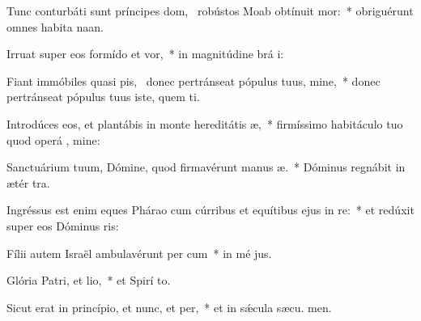 \item Tunc conturbáti sunt príncipes dom,~\pscross{} robústos Moab obtínuit mor:~* obriguérunt omnes habita naan.
\item Irruat super eos formído et vor,~* in magnitúdine brá i:
\item Fiant immóbiles quasi pis,~\pscross{} donec pertránseat pópulus tuus, mine,~* donec pertránseat pópulus tuus iste, quem ti.
\item Introdúces eos, et plantábis in monte hereditátis æ,~* firmíssimo habitáculo tuo quod operá , mine:
\item Sanctuárium tuum, Dómine, quod firmavérunt manus æ.~* Dóminus regnábit in ætér  tra.
\item Ingréssus est enim eques Phárao cum cúrribus et equítibus ejus in re:~* et redúxit super eos Dóminus  ris:
\item Fílii autem Israël ambulavérunt per cum~* in mé jus.
\item Glória Patri, et lio,~* et Spirí to.
\item Sicut erat in princípio, et nunc, et per,~* et in sǽcula sæcu. men.
